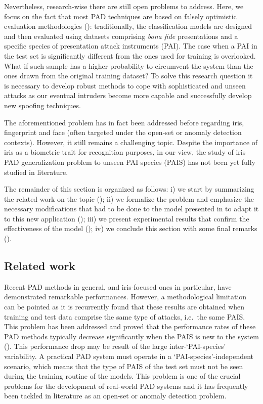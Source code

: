 Nevertheless, research-wise there are still open problems to address. Here, we focus on the fact that most PAD techniques are based on falsely optimistic evaluation methodologies (\citet{sequeira2016realistic}): traditionally, the classification models are designed and then evaluated using datasets comprising \emph{bona fide} presentations and a specific species of presentation attack instruments (PAI). The case when a PAI in the test set is significantly different from the ones used for training is overlooked. What if such sample has a higher probability to circumvent the system than the ones drawn from the original training dataset? To solve this research question it is necessary to develop robust methods to cope with sophisticated and unseen attacks as our eventual intruders become more capable and successfully develop new spoofing techniques.

The aforementioned problem has in fact been addressed before regarding iris, fingerprint and face (often targeted under the open-set or anomaly detection contexts). However, it still remains a challenging topic. Despite the importance of iris as a biometric trait for recognition purposes, in our view, the study of iris PAD generalization problem to unseen PAI species (PAIS) has not been yet fully studied in literature.

The remainder of this section is organized as follows: i) we start by summarizing the related work on the topic (); ii) we formalize the problem and emphasize the necessary modifications that had to be done to the model presented in  to adapt it to this new application (); iii) we present experimental results that confirm the effectiveness of the model (); iv) we conclude this section with some final remarks ().

\subsection{Related work}
\label{sec:adv_iris_attack_rel_work}

Recent PAD methods in general, and iris-focused ones in particular, have demonstrated remarkable performances. However, a methodological limitation can be pointed as it is recurrently found that these results are obtained when training and test data comprise the same type of attacks, i.e.\ the same PAIS. This problem has been addressed and proved that the performance rates of these PAD methods typically decrease significantly when the PAIS is new to the system (\citet{marasco2011robustness,bowyer2014cosmetic,sequeira2016realistic}). This performance drop may be result of the large inter-`PAI-species' variability. A practical PAD system must operate in a `PAI-species'-independent scenario, which means that the type of PAIS of the test set must not be seen during the training routine of the models. This problem is one of the crucial problems for the development of real-world PAD systems and it has frequently been tackled in literature as an open-set or anomaly detection problem.

